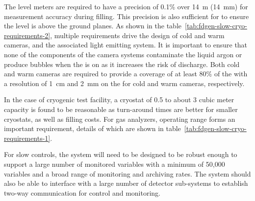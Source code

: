 The level meters are required to have a precision of 0.1\% over 14~m (14~mm) for measurement accuracy during filling. This precision is also sufficient for  to ensure the  level is above the ground planes. As shown in the table~\ref{tab:fdgen-slow-cryo-requirements-2}, multiple requirements drive the design of cold and warm cameras, and the associated light emitting system. It is important to ensure that none of the components of the camera systems contaminate the liquid argon or produce bubbles when the  is on as it increases the risk of  discharge. Both cold and warm cameras are required to provide a coverage of at least 80\% of the  with a resolution of 1~cm and 2~mm on the  for cold and warm cameras, respectively.

In the case of cryogenic test facility, a cryostat of 0.5 to about 3 cubic meter capacity is found to be reasonable as turn-around times are better for smaller cryostats, as well as filling costs. For gas analyzers, operating range forms an important requirement, details of which are shown in table~\ref{tab:fdgen-slow-cryo-requirements-1}.

For slow controls, the system will need to be designed to be robust enough to support a large number of monitored variables with a minimum of 50,000 variables and a broad range of monitoring and archiving rates. The system should also be able to interface with a large number of detector sub-systems to establish two-way communication for control and monitoring. 


